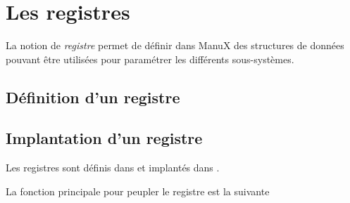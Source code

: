 %
\section{Les registres}

   La notion de {\em registre} permet de définir dans ManuX des
structures de données pouvant être utilisées pour paramétrer les
différents sous-systèmes.

   
\subsection{Définition d'un registre}

\subsection{Implantation d'un registre}

   Les registres sont définis dans  et
implantés dans .

La fonction principale pour peupler le registre est la suivante

